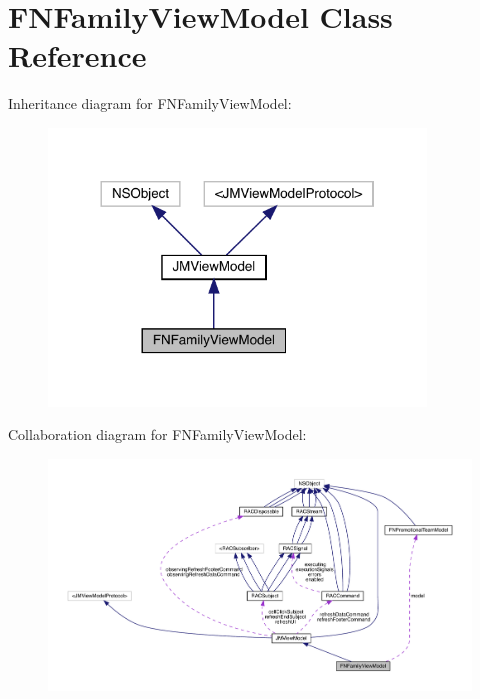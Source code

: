 \hypertarget{interface_f_n_family_view_model}{}\section{F\+N\+Family\+View\+Model Class Reference}
\label{interface_f_n_family_view_model}


Inheritance diagram for F\+N\+Family\+View\+Model\+:\nopagebreak
\begin{figure}[H]
\begin{center}
\leavevmode
\includegraphics[width=284pt]{interface_f_n_family_view_model__inherit__graph}
\end{center}
\end{figure}


Collaboration diagram for F\+N\+Family\+View\+Model\+:\nopagebreak
\begin{figure}[H]
\begin{center}
\leavevmode
\includegraphics[width=350pt]{interface_f_n_family_view_model__coll__graph}
\end{center}
\end{figure}
